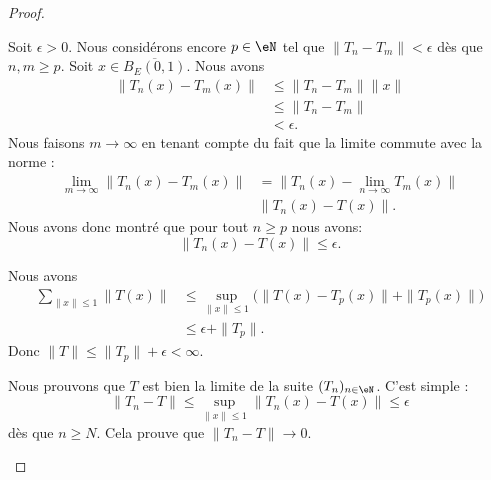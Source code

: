 \begin{proof}
\begin{subproof}
		Soit \( \epsilon>0\). Nous considérons encore \( p\in \eN\) tel que \( \| T_n-T_m \|<\epsilon\) dès que \( n,m\geq p\). Soit \( x\in \overline{B_E(0,1)}\). Nous avons
		\begin{subequations}
			\begin{align}
				\| T_n(x)-T_m(x) \| & \leq \| T_n-T_m \|\| x \| \\
				                    & \leq \| T_n-T_m \|        \\
				                    & <\epsilon.
			\end{align}
		\end{subequations}
		Nous faisons \( m\to \infty\) en tenant compte du fait que la limite commute avec la norme :
		\begin{subequations}
			\begin{align}
				\lim_{m\to\infty}\| T_n(x)-T_m(x) \| & =\| T_n(x)-\lim_{n\to \infty}T_m(x) \| \\
				                                     & \| T_n(x)-T(x) \|.
			\end{align}
		\end{subequations}
		Nous avons donc montré que pour tout \( n\geq p\) nous avons:
		\begin{equation}
			\| T_n(x)-T(x) \|\leq \epsilon.
		\end{equation}

		Nous avons
		\begin{subequations}
			\begin{align}
				\sum_{\| x \|\leq 1}\| T(x) \| & \leq \sup_{\| x \|\leq 1}\Big( \| T(x)-T_p(x) \|+\| T_p(x) \| \Big) \\
				                               & \leq \epsilon+\| T_p \|.
			\end{align}
		\end{subequations}
		Donc \( \| T \|\leq \| T_p \|+\epsilon<\infty\).

		\spitem[Limite]
		Nous prouvons que \( T\) est bien la limite de la suite \( (T_n)_{n\in \eN}\). C'est simple :
		\begin{equation}
			\| T_n-T \|\leq \sup_{\| x \|\leq 1}\| T_n(x)-T(x) \|\leq\epsilon
		\end{equation}
		dès que \( n\geq N\). Cela prouve que \( \| T_n-T \|\to 0\).
	\end{subproof}
\end{proof}


